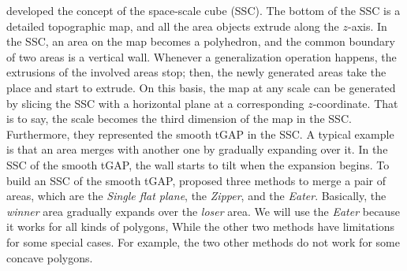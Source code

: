\documentclass{ica}
\begin{document}
developed the concept of the space-scale cube (SSC).
The bottom of the SSC is a detailed topographic map,
and all the area objects extrude along the $z$-axis.
In the SSC, an area on the map becomes a polyhedron, and
the common boundary of two areas is a vertical wall.
Whenever a generalization operation happens, 
the extrusions of the involved areas stop;
then, the newly generated areas take the place and start to extrude.
On this basis, the map at any scale can be generated by slicing the SSC 
with a horizontal plane at a corresponding $z$-coordinate.
That is to say, the scale becomes the third dimension of the map in the SSC.
Furthermore, they represented the smooth tGAP in the SSC.
A typical example is that 
an area merges with another one by gradually expanding over it.
In the SSC of the smooth tGAP, 
the wall starts to tilt when the expansion begins.
To build an SSC of the smooth tGAP, 
\citet{Suba2014Merge} proposed three methods 
to merge a pair of areas, 
which are the \emph{Single flat plane}, 
the \emph{Zipper}, and the \emph{Eater}.
Basically, the \emph{winner} area gradually expands over the \emph{loser} area.
We will use the \emph{Eater} because it works for all kinds of polygons,
While the other two methods have limitations for some special cases.
For example, the two other methods do not work for some concave polygons.




\end{document}
